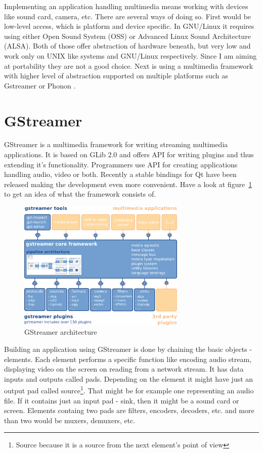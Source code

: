 Implementing an application handling multimedia means working with devices like sound card, camera, etc. There are several ways of doing so. First would be low-level access, which is platform and device specific. In GNU/Linux it requires using either Open Sound System (OSS) or Advanced Linux Sound Architecture (ALSA). Both of those offer abstraction of hardware beneath, but very low and work only on UNIX like systems and GNU/Linux respectively. Since I am aiming at portability they are not a good choice. Next is using a multimedia framework with higher level of abstraction supported on multiple platforms such as Gstreamer \cite{gstreamer} or Phonon \cite{phonon}.  

\section{GStreamer}
GStreamer is a multimedia framework for writing streaming multimedia applications. It is based on GLib 2.0 and offers API for writing plugins and thus extending it's functionality. Programmers use API for creating applications handling audio, video or both. Recently a stable bindings for Qt have been released making the development even more convenient. Have a look at figure~\ref{fig:gstreamerArchitecture} to get an idea of what the framework consists of.  

\begin{figure}[ht]
	\begin{center}
	\includegraphics[width=8cm]{fig/gstreamer-architecture.png}
	\caption{GStreamer architecture}
	\label{fig:gstreamerArchitecture}
\end{center}
\end{figure}

Building an application using GStreamer is done by chaining the basic objects - elements. Each element performs a specific function like encoding audio stream, displaying video on the screen on reading from a network stream. It has data inputs and outputs called pads. Depending on the element it might have just an output pad called source\footnote{Source because it is a source from the next element's point of view}. That might be for example one representing an audio file. If it contains just an input pad - sink, then it might be a sound card or screen. Elements containg two pads are filters, encoders, decoders, etc. and more than two would be muxers, demuxers, etc.

